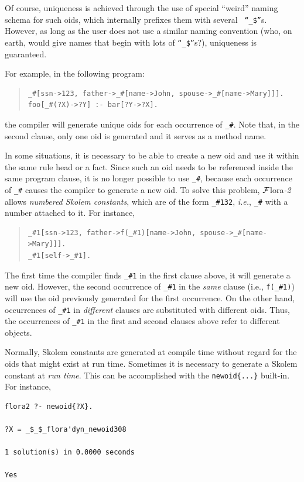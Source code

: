 \documentclass[11pt]{article}
\newcommand{\FLORA}{{\mbox{\sc ${\cal F}${lora}\rm\emph{-2}}}\xspace}
\begin{document}
Of course, uniqueness is achieved through the use of special ``weird'' naming
schema for such oids, which internally prefixes them with several {\tt
  ``\_\$''}s. However, as long as the user does not use a similar
naming convention (who, on earth, would give names that begin with lots of
{\tt ``\_\$''}s?), uniqueness is guaranteed.


For example, in the following program:
\begin{quote}
\begin{verbatim}
_#[ssn->123, father->_#[name->John, spouse->_#[name->Mary]]].
foo[_#(?X)->?Y] :- bar[?Y->?X].
\end{verbatim}
\end{quote}
the compiler will generate unique oids for each occurrence of {\tt \_\#}.
Note that, in the second clause, only one oid is generated and it serves as
a method name.

In some situations, it is necessary to be able to create a new oid and use it
within the same rule head or a fact. Since such an oid 
needs to be referenced inside the same program clause, it is no longer
possible to use \verb|_#|, because each occurrence of \verb|_#| causes the
compiler to generate a new oid. To solve this problem, \FLORA allows 
\emph{numbered Skolem constants}, which are of the form \verb|_#132|, {\it
  i.e.}, \verb|_#| with a number attached to it. For instance, 
\begin{quote}
\begin{verbatim}
_#1[ssn->123, father->f(_#1)[name->John, spouse->_#[name->Mary]]].
_#1[self->_#1].
\end{verbatim}
\end{quote}
The first time the compiler finds \verb|_#1| in the first clause above,
it will generate a new oid. However, the second occurrence of \verb|_#1|
in the \emph{same} clause (i.e., \verb|f(_#1)|)  will use the oid
previously generated for the first occurrence. On the other hand,
occurrences of \verb|_#1| in \emph{different} clauses are substituted with
different oids. Thus, the occurrences of \verb|_#1| in the first and second
clauses above refer to different objects.

Normally,
Skolem constants are generated at compile time without regard for the oids
that might exist at run time. Sometimes it is necessary to generate a
Skolem constant at \emph{run time}. This can be accomplished with the
{\tt newoid\{...\}} built-in. For instance, 
\begin{verbatim}
flora2 ?- newoid{?X}.
 
?X = _$_$_flora'dyn_newoid308
 
1 solution(s) in 0.0000 seconds 
 
Yes
\end{verbatim}
\end{document}
